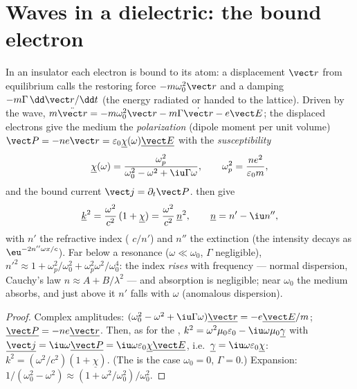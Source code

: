 \section{Waves in a dielectric: the bound electron}

\begin{proposition}\label{prop:b2:waves-in-media:lorentz}
In an insulator each electron is bound to its atom: a displacement
$\vect r$ from equilibrium calls the restoring force $-m\omega_0^2\vect r$ and
a damping $-m\Gamma\,\dd\vect r/\dd t$ (the energy radiated or handed to the
lattice). Driven by the wave, $m\ddot{\vect r} = -m\omega_0^2\vect r - m\Gamma\dot{\vect r}
- e\vect E$; the displaced electrons give the medium the \emph{polarization}
(dipole moment per unit volume) $\vect P = -ne\vect r = \varepsilon_0\underline\chi(\omega)
\underline{\vect E}$ with the \emph{susceptibility}
\[
\underline\chi(\omega) = \frac{\omega_p^2}{\omega_0^2 - \omega^2 + \iu\Gamma\omega} ,
\qquad \omega_p^2 = \frac{ne^2}{\varepsilon_0m} ,
\]
and the bound current $\vect j = \partial_t\vect P$.  then give
\[
\underline k^2 = \frac{\omega^2}{c^2}\,(1 + \underline\chi) = \frac{\omega^2}{c^2}\,\underline n^2 ,
\qquad \underline n = n' - \iu n'' ,
\]
with $n'$ the refractive index ( $c/n'$) and $n''$ the
extinction (the intensity decays as $\eu^{-2n''\omega x/c}$). Far below a
resonance ($\omega \ll \omega_0$, $\Gamma$ negligible), $n'^2 \approx 1 + \omega_p^2/\omega_0^2 +
\omega_p^2\omega^2/\omega_0^4$: the index \emph{rises} with frequency --- normal
dispersion, Cauchy's law $n \approx A + B/\lambda^2$ --- and absorption is
negligible; near $\omega_0$ the medium absorbs, and just above it $n'$
falls with $\omega$ (anomalous dispersion).
\end{proposition}

\begin{proof}
Complex amplitudes: $(\omega_0^2 - \omega^2 + \iu\Gamma\omega)\underline{\vect r} = -e\underline{\vect E}
/m$; $\underline{\vect P} = -ne\underline{\vect r}$. Then, as for the , $k^2 = \omega^2\mu_0
\varepsilon_0 - \iu\omega\mu_0\underline\gamma$ with $\underline{\vect j} = \iu\omega\underline{\vect P} = \iu\omega\varepsilon_0
\underline\chi\underline{\vect E}$, i.e.\ $\underline\gamma = \iu\omega\varepsilon_0\underline\chi$: $k^2 = (\omega^2/c^2)
(1 + \underline\chi)$. (The  is the case $\omega_0 = 0$, $\Gamma = 0$.)
Expansion: $1/(\omega_0^2 - \omega^2) \approx (1 + \omega^2/\omega_0^2)/\omega_0^2$.
\end{proof}

